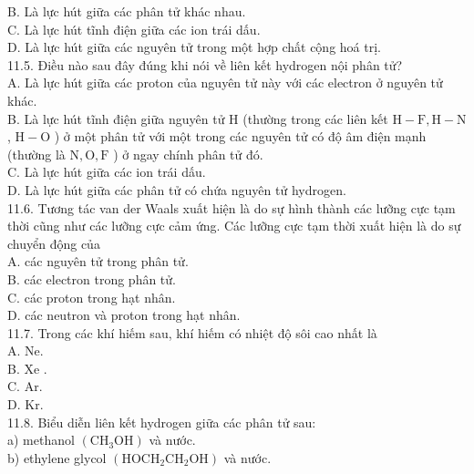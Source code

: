 \documentclass[10pt]{article}
\begin{document}
B. Là lực hút giữa các phân tử khác nhau.\\
C. Là lực hút tĩnh điện giữa các ion trái dấu.\\
D. Là lực hút giữa các nguyên tử trong một hợp chất cộng hoá trị.\\
11.5. Điều nào sau đây đúng khi nói về liên kết hydrogen nội phân tử?\\
A. Là lực hút giữa các proton của nguyên tử này với các electron ở nguyên tử khác.\\
B. Là lực hút tĩnh điện giữa nguyên tử H (thường trong các liên kết $\mathrm{H}-\mathrm{F}, \mathrm{H}-\mathrm{N}$, $\mathrm{H}-\mathrm{O}$ ) ở một phân tử với một trong các nguyên tử có độ âm điện mạnh (thường là $\mathrm{N}, \mathrm{O}, \mathrm{F}$ ) ở ngay chính phân tử đó.\\
C. Là lực hút giữa các ion trái dấu.\\
D. Là lực hút giữa các phân tử có chứa nguyên tử hydrogen.\\
11.6. Tương tác van der Waals xuất hiện là do sự hình thành các lưỡng cực tạm thời cũng như các lưỡng cực cảm ứng. Các lưỡng cực tạm thời xuất hiện là do sự chuyển động của\\
A. các nguyên tử trong phân tử.\\
B. các electron trong phân tử.\\
C. các proton trong hạt nhân.\\
D. các neutron và proton trong hạt nhân.\\
11.7. Trong các khí hiếm sau, khí hiếm có nhiệt độ sôi cao nhất là\\
A. Ne.\\
B. Xe .\\
C. Ar.\\
D. Kr.\\
11.8. Biểu diễn liên kết hydrogen giữa các phân tử sau:\\
a) methanol $\left(\mathrm{CH}_{3} \mathrm{OH}\right)$ và nước.\\
b) ethylene glycol $\left(\mathrm{HOCH}_{2} \mathrm{CH}_{2} \mathrm{OH}\right)$ và nước.
\end{document}
